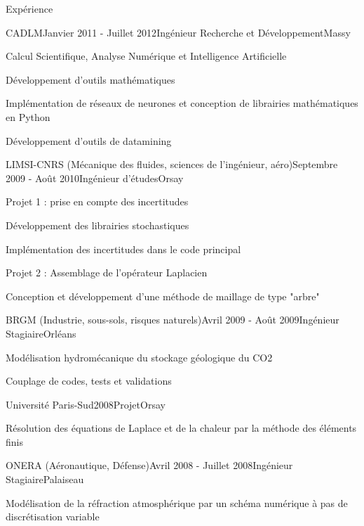 \documentclass{resume} %
\begin{document}
\begin{rSection}{Expérience}

\begin{rSubsection}{CADLM}{Janvier 2011 - Juillet 2012}{Ingénieur Recherche et Développement}{Massy}
\item Calcul Scientifique, Analyse Numérique et Intelligence Artificielle
\item Développement d'outils mathématiques
\item Implémentation de réseaux de neurones et conception de librairies mathématiques en Python
\item Développement d'outils de datamining
\end{rSubsection}


\begin{rSubsection}{LIMSI-CNRS (Mécanique des fluides, sciences de l'ingénieur, aéro)}{Septembre 2009 - Août 2010}{Ingénieur d'études}{Orsay}
\item Projet 1 : prise en compte des incertitudes
\item Développement des librairies stochastiques
\item Implémentation des incertitudes dans le code principal \smallskip
\item Projet 2 : Assemblage de l'opérateur Laplacien
\item Conception et développement d'une méthode de maillage de type "arbre"
\end{rSubsection}


\begin{rSubsection}{BRGM (Industrie, sous-sols, risques naturels)}{Avril 2009 - Août 2009}{Ingénieur Stagiaire}{Orléans}
\item Modélisation hydromécanique du stockage géologique du CO2
\item Couplage de codes, tests et validations
\end{rSubsection}


\begin{rSubsection}{Université Paris-Sud}{2008}{Projet}{Orsay}
\item Résolution des équations de Laplace et de la chaleur par la méthode des éléments finis
\end{rSubsection}


\begin{rSubsection}{ONERA (Aéronautique, Défense)}{Avril 2008 - Juillet 2008}{Ingénieur Stagiaire}{Palaiseau}
\item Modélisation de la réfraction atmosphérique par un schéma numérique à pas de discrétisation variable
\end{rSubsection}

\end{rSection}
\end{document}
